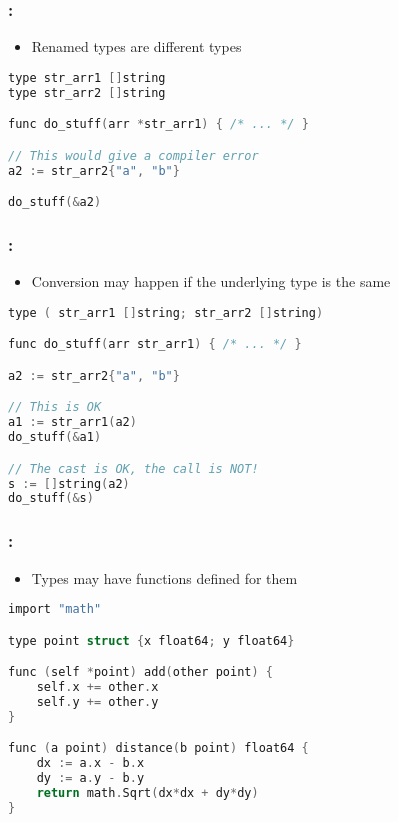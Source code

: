 \begin{frame}[fragile]
    \frametitle{\secname: \small\subsecname\normalsize}

    \begin{itemize}
        \item Renamed types are different types
    \end{itemize}

    \small \begin{lstlisting}[language=c]
type str_arr1 []string
type str_arr2 []string

func do_stuff(arr *str_arr1) { /* ... */ }

// This would give a compiler error
a2 := str_arr2{"a", "b"}

do_stuff(&a2)
    \end{lstlisting} \normalsize
\end{frame}

\begin{frame}[fragile]
    \frametitle{\secname: \small\subsecname\normalsize}

    \begin{itemize}
        \item Conversion may happen if the underlying type is the same
    \end{itemize}

    \small \begin{lstlisting}[language=c]
type ( str_arr1 []string; str_arr2 []string)

func do_stuff(arr str_arr1) { /* ... */ }

a2 := str_arr2{"a", "b"}

// This is OK
a1 := str_arr1(a2)
do_stuff(&a1)

// The cast is OK, the call is NOT!
s := []string(a2)
do_stuff(&s)
    \end{lstlisting} \normalsize
\end{frame}

\begin{frame}[fragile]
    \frametitle{\secname: \small\subsecname\normalsize}

    \begin{itemize}
        \item Types may have functions defined for them
    \end{itemize}


    \small \begin{lstlisting}[language=c]
import "math"

type point struct {x float64; y float64}

func (self *point) add(other point) {
    self.x += other.x
    self.y += other.y
}

func (a point) distance(b point) float64 {
    dx := a.x - b.x
    dy := a.y - b.y
    return math.Sqrt(dx*dx + dy*dy)
}
    \end{lstlisting} \normalsize
\end{frame}

